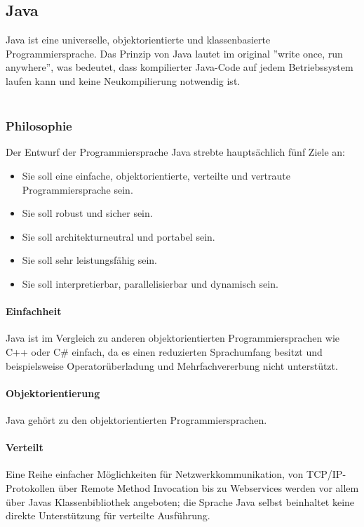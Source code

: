 \subsection{Java}
Java ist eine universelle, objektorientierte und klassenbasierte Programmiersprache. Das Prinzip von Java lautet im original ''write once, run anywhere'', was bedeutet, dass kompilierter Java-Code auf jedem Betriebssystem laufen kann und keine Neukompilierung notwendig ist.\\
\\

\subsubsection{Philosophie}
Der Entwurf der Programmiersprache Java strebte hauptsächlich fünf Ziele an:

\begin{itemize}
	\item Sie soll eine einfache, objektorientierte, verteilte und vertraute Programmiersprache sein.
	\item Sie soll robust und sicher sein.
	\item Sie soll architekturneutral und portabel sein.
	\item Sie soll sehr leistungsfähig sein.
	\item Sie soll interpretierbar, parallelisierbar und dynamisch sein.
\end{itemize}
\noindent


\setcounter{secnumdepth}{4}
\paragraph{Einfachheit}
Java ist im Vergleich zu anderen objektorientierten Programmiersprachen wie C++ oder C\# einfach, da es einen reduzierten Sprachumfang besitzt und beispielsweise Operatorüberladung und Mehrfachvererbung nicht unterstützt.

\paragraph{Objektorientierung}
Java gehört zu den objektorientierten Programmiersprachen.

\paragraph{Verteilt}
Eine Reihe einfacher Möglichkeiten für Netzwerkkommunikation, von TCP/IP-Protokollen über Remote Method Invocation bis zu Webservices werden vor allem über Javas Klassenbibliothek angeboten; die Sprache Java selbst beinhaltet keine direkte Unterstützung für verteilte Ausführung.

